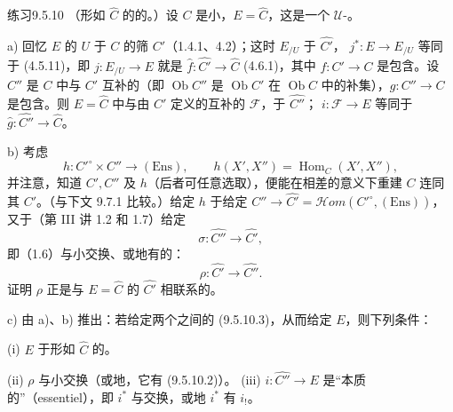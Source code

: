 \begin{SGAresult}{练习}{9.5.10}
（形如 $\widehat C$ 的的。）设 $C$ 是小，$E=\widehat C$，这是一个 $\mathcal U$-。

a) 回忆 $E$ 的 $U$ 于 $C$ 的筛 $C'$（1.4.1、4.2）；这时 $E_{/U}$ 于 $\widehat{C'}$， $j^*:E\to E_{/U}$ 等同于 (4.5.11)，即 $j:E_{/U}\to E$ 就是 $\widehat f:\widehat{C'}\to\widehat C$ (4.6.1)，其中 $f:C'\to C$ 是包含。设 $C''$ 是 $C$ 中与 $C'$ 互补的（即 $\operatorname{Ob}C''$ 是 $\operatorname{Ob}C'$ 在 $\operatorname{Ob}C$ 中的补集），$g:C''\to C$ 是包含。则 $E=\widehat C$ 中与由 $C'$ 定义的互补的 $\mathscr F$，于 $\widehat{C''}$； $i:\mathscr F\to E$ 等同于 $\widehat g:\widehat{C''}\to\widehat C$。

b) 考虑
\[
h:C'^\circ\times C''\longrightarrow(\mathrm{Ens}),\qquad h(X',X'')=\operatorname{Hom}_C(X',X''),\tag{9.5.10.1}
\]
并注意，知道 $C',C''$ 及 $h$（后者可任意选取），便能在相差的意义下重建 $C$ 连同其 $C'$。（与下文 9.7.1 比较。）给定 $h$ 于给定 $C''\to\widehat{C'}=\mathscr{H}om(C'^\circ,(\mathrm{Ens}))$，又于（第 III 讲 1.2 和 1.7）给定
\[
\sigma:\widehat{C''}\longrightarrow\widehat{C'},\tag{9.5.10.2}
\]
即（1.6）与小交换、或地有的：
\[
\rho:\widehat{C'}\longrightarrow\widehat{C''}.\tag{9.5.10.3}
\]
证明 $\rho$ 正是与 $E=\widehat C$ 的 $\widehat{C'}$ 相联系的。

c) 由 a)、b) 推出：若给定两个之间的 (9.5.10.3)，从而给定 $E$，则下列条件：

(i) $E$ 于形如 $\widehat C$ 的。

(ii)  $\rho$ 与小交换（或地，它有 (9.5.10.2)）。
(iii)  $i:\widehat{C''}\to E$ 是“本质的”（essentiel），即 $i^*$ 与交换，或地 $i^*$ 有 $i_!$。


\end{SGAresult}
